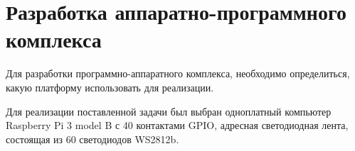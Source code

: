 \section{Разработка аппаратно-программного комплекса}

Для разработки программно-аппаратного комплекса, необходимо определиться, какую платформу использовать для реализации.

Для реализации поставленной задачи был выбран одноплатный компьютер Raspberry Pi 3 model B с 40 контактами GPIO, адресная светодиодная лента, состоящая из 60 светодиодов WS2812b.





% 
%
